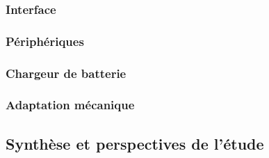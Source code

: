 \subsubsection{Interface} \label{sssec:Interface}

\subsubsection{Périphériques} \label{sssec:Peripheriques}

\subsubsection{Chargeur de batterie} \label{sssec:Chargeur-bat}

\subsubsection{Adaptation mécanique} \label{sssec:Adaptation-mech}

\subsection{Synthèse et perspectives de l'étude} \label{ssec:Synth-etude}